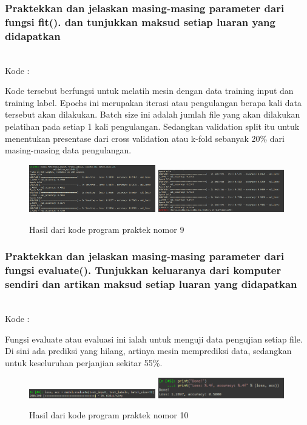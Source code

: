 \subsubsection{Praktekkan dan jelaskan masing-masing parameter dari fungsi fit(). dan tunjukkan maksud setiap luaran yang didapatkan}
\hfill\\
Kode :


Kode tersebut berfungsi untuk melatih mesin dengan data training input dan training label. Epochs ini merupakan iterasi atau pengulangan berapa kali data tersebut akan dilakukan. Batch size ini adalah jumlah file yang akan dilakukan pelatihan pada setiap 1 kali pengulangan. Sedangkan validation split itu untuk menentukan presentase dari cross validation atau k-fold sebanyak 20\% dari masing-masing data pengulangan.
\begin{figure}[H]
	\centering
	\includegraphics[width=5.5cm]{figures/1174083/figures6/37.png}		
	\includegraphics[width=5.5cm]{figures/1174083/figures6/38.png}	
	\caption{Hasil dari kode program praktek nomor 9}
\end{figure}

\subsubsection{Praktekkan dan jelaskan masing-masing parameter dari fungsi evaluate(). Tunjukkan keluaranya dari komputer sendiri dan artikan maksud setiap luaran yang didapatkan}
\hfill\\
Kode :


Fungsi evaluate atau evaluasi ini ialah untuk menguji data pengujian setiap file. Di sini ada prediksi yang hilang, artinya mesin memprediksi data, sedangkan untuk keseluruhan perjanjian sekitar 55\%.
\begin{figure}[H]
	\centering
	\includegraphics[width=5.5cm]{figures/1174083/figures6/39.png}			
	\includegraphics[width=5.5cm]{figures/1174083/figures6/40.png}	
	\caption{Hasil dari kode program praktek nomor 10}
\end{figure}

